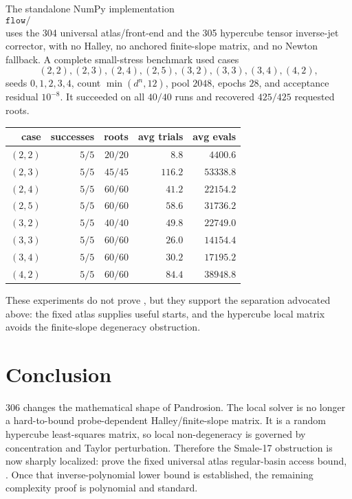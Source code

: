 \documentclass[11pt]{article}
\begin{document}
The standalone NumPy implementation
\[
\texttt{flow/306\_pandrosion\_universal\_atlas\_hypercube\_inversejet\_numpy\_engine.py}
\]
uses the 304 universal atlas/front-end and the 305 hypercube tensor inverse-jet corrector, with no Halley, no anchored finite-slope matrix, and no Newton fallback.  A complete small-stress benchmark used cases
\[
(2,2),(2,3),(2,4),(2,5),(3,2),(3,3),(3,4),(4,2),
\]
seeds $0,1,2,3,4$, count $\min(d^n,12)$, pool $2048$, epochs $28$, and acceptance residual $10^{-8}$.  It succeeded on all $40/40$ runs and recovered $425/425$ requested roots.

\begin{center}
\begin{tabular}{rrrrr}
\toprule
case & successes & roots & avg trials & avg evals\\
\midrule
$(2,2)$ & $5/5$ & $20/20$ & $8.8$ & $4400.6$\\
$(2,3)$ & $5/5$ & $45/45$ & $116.2$ & $53338.8$\\
$(2,4)$ & $5/5$ & $60/60$ & $41.2$ & $22154.2$\\
$(2,5)$ & $5/5$ & $60/60$ & $58.6$ & $31736.2$\\
$(3,2)$ & $5/5$ & $40/40$ & $49.8$ & $22749.0$\\
$(3,3)$ & $5/5$ & $60/60$ & $26.0$ & $14154.4$\\
$(3,4)$ & $5/5$ & $60/60$ & $30.2$ & $17195.2$\\
$(4,2)$ & $5/5$ & $60/60$ & $84.4$ & $38948.8$\\
\bottomrule
\end{tabular}
\end{center}

These experiments do not prove , but they support the separation advocated above: the fixed atlas supplies useful starts, and the hypercube local matrix avoids the finite-slope degeneracy obstruction.

\section{Conclusion}

306 changes the mathematical shape of Pandrosion.  The local solver is no longer a hard-to-bound probe-dependent Halley/finite-slope matrix.  It is a random hypercube least-squares matrix, so local non-degeneracy is governed by concentration and Taylor perturbation.  Therefore the Smale-17 obstruction is now sharply localized: prove the fixed universal atlas regular-basin access bound, .  Once that inverse-polynomial lower bound is established, the remaining complexity proof is polynomial and standard.
\end{document}
